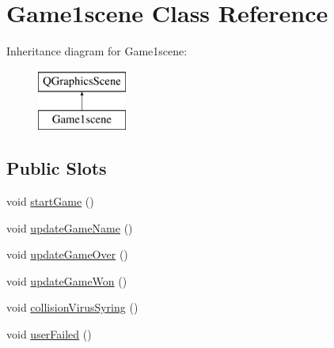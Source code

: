 \hypertarget{classGame1scene}{\section{Game1scene Class Reference}
\label{classGame1scene}
}
Inheritance diagram for Game1scene\-:\begin{figure}[H]
\begin{center}
\leavevmode
\includegraphics[height=2.000000cm]{classGame1scene}
\end{center}
\end{figure}
\subsection*{Public Slots}
\begin{DoxyCompactItemize}
\item 
void \hyperlink{classGame1scene_aed2bf72aa8fb9698424760590e3eb0de}{start\-Game} ()
\item 
void \hyperlink{classGame1scene_aba975bbe2c5836b193dd7b926b8b0702}{update\-Game\-Name} ()
\item 
void \hyperlink{classGame1scene_a65469907d0aae6863b08ba2ddd1981a0}{update\-Game\-Over} ()
\item 
void \hyperlink{classGame1scene_a3f3f1d903dbdef7ebbc67851fabd4653}{update\-Game\-Won} ()
\item 
void \hyperlink{classGame1scene_a0b4d618af2afa4e519e2deb5e44b865f}{collision\-Virus\-Syring} ()
\item 
void \hyperlink{classGame1scene_abd445be522dcf4d6f6576db9e0f95bee}{user\-Failed} ()
\end{DoxyCompactItemize}
